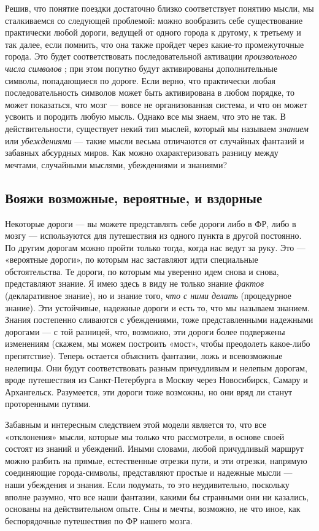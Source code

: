 \documentclass[../main.tex]{subfiles}
\begin{document}
Решив, что понятие поездки достаточно близко соответствует понятию мысли, мы сталкиваемся со следующей проблемой: можно вообразить себе существование практически любой дороги, ведущей от одного города к другому, к третьему и так далее, если помнить, что она также пройдет через какие-то промежуточные города. Это будет соответствовать последовательной активации \emph{произвольного числа символов} ; при этом попутно будут активированы дополнительные символы, попадающиеся по дороге. Если верно, что практически любая последовательность символов может быть активирована в любом порядке, то может показаться, что мозг --- вовсе не организованная система, и что он может усвоить и породить любую мысль. Однако все мы знаем, что это не так. В действительности, существует некий тип мыслей, который мы называем \emph{знанием} или \emph{убеждениями} --- такие мысли весьма отличаются от случайных фантазий и забавных абсурдных миров. Как можно охарактеризовать разницу между мечтами, случайными мыслями, убеждениями и знаниями?


\subsection{Вояжи возможные, вероятные, и вздорные}

Некоторые дороги --- вы можете представлять себе дороги либо в ФР, либо в мозгу --- используются для путешествия из одного пункта в другой постоянно. По другим дорогам можно пройти только тогда, когда нас ведут за руку. Это --- «вероятные дороги», по которым нас заставляют идти специальные обстоятельства. Те дороги, по которым мы уверенно идем снова и снова, представляют знание. Я имею здесь в виду не только знание \emph{фактов} (декларативное знание), но и знание того, \emph{что с ними делать} (процедурное знание). Эти устойчивые, надежные дороги и есть то, что мы называем знанием. Знания постепенно сливаются с убеждениями, тоже представленными надежными дорогами --- с той разницей, что, возможно, эти дороги более подвержены изменениям (скажем, мы можем построить «мост», чтобы преодолеть какое-либо препятствие). Теперь остается объяснить фантазии, ложь и всевозможные нелепицы. Они будут соответствовать разным причудливым и нелепым дорогам, вроде путешествия из Санкт-Петербурга в Москву через Новосибирск, Самару и Архангельск. Разумеется, эти дороги тоже возможны, но они вряд ли станут проторенными путями.

Забавным и интересным следствием этой модели является то, что все «отклонения» мысли, которые мы только что рассмотрели, в основе своей состоят из знаний и убеждений. Иными словами, любой причудливый маршрут можно разбить на прямые, естественные отрезки пути, и эти отрезки, напрямую соединяющие города-символы, представляют простые и надежные мысли --- наши убеждения и знания. Если подумать, то это неудивительно, поскольку вполне разумно, что все наши фантазии, какими бы странными они ни казались, основаны на действительном опыте. Сны и мечты, возможно, не что иное, как беспорядочные путешествия по ФР нашего мозга.
\end{document}

